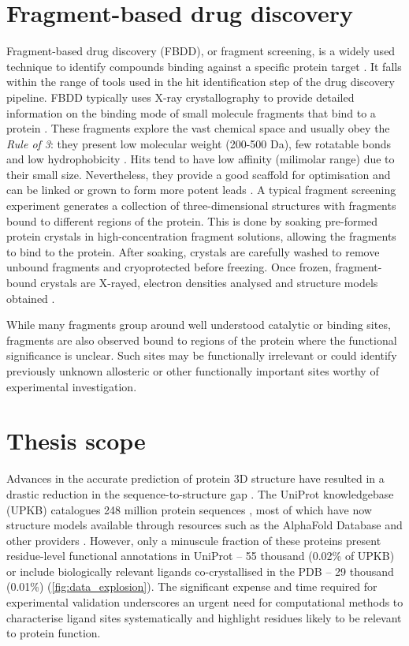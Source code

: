 \section{Fragment-based drug discovery}

Fragment-based drug discovery (FBDD), or fragment screening, is a widely used technique to identify compounds binding against a specific protein target \cite{MURRAY_2009_FBDD}. It falls within the range of tools used in the hit identification step of the drug discovery pipeline. FBDD typically uses X-ray crystallography to provide detailed information on the binding mode of small molecule fragments that bind to a protein \cite{REES_2004_FBLD}. These fragments explore the vast chemical space and usually obey the \textit{Rule of 3}: they present low molecular weight (200-500 Da), few rotatable bonds and low hydrophobicity \cite{CONGREVE_2003_RO3}. Hits tend to have low affinity (milimolar range) due to their small size. Nevertheless, they provide a good scaffold for optimisation and can be linked or grown to form more potent leads \cite{SCHIEBEL_2016_FRAGMENTS}. A typical fragment screening experiment generates a collection of three-dimensional structures with fragments bound to different regions of the protein. This is done by soaking pre-formed protein crystals in high-concentration fragment solutions, allowing the fragments to bind to the protein. After soaking, crystals are carefully washed to remove unbound fragments and cryoprotected before freezing. Once frozen, fragment-bound crystals are X-rayed, electron densities analysed and structure models obtained \cite{PATEL_2014_FS}.

While many fragments group around well understood catalytic or binding sites, fragments are also observed bound to regions of the protein where the functional significance is unclear. Such sites may be functionally irrelevant or could identify previously unknown allosteric or other functionally important sites worthy of experimental investigation.

\section{Thesis scope}

Advances in the accurate prediction of protein 3D structure have resulted in a drastic reduction in the sequence-to-structure gap \cite{ABRAMSON_2024_ALPHAFOLD3}. The UniProt knowledgebase (UPKB) catalogues 248 million protein sequences \cite{UNIPROT_2018_UNIPROT, UNIPROT_2023_UNIPROT}, most of which have now structure models available through resources such as the AlphaFold Database \cite{VARADI_2022_ALPHAFOLDDB} and other providers \cite{GUEX_2009_SWISSMODEL, BEIENERT_2016_SWISSMODEL, WATERHOUSE_2018_SWISSMODEL}. However, only a minuscule fraction of these proteins present residue-level functional annotations in UniProt -- 55 thousand (0.02\% of UPKB) or include biologically relevant ligands co-crystallised in the PDB \cite{wwPDB_2019_PDB} -- 29 thousand (0.01\%) (\autoref{fig:data_explosion}). The significant expense and time required for experimental validation underscores an urgent need for computational methods to characterise ligand sites systematically and highlight residues likely to be relevant to protein function.

